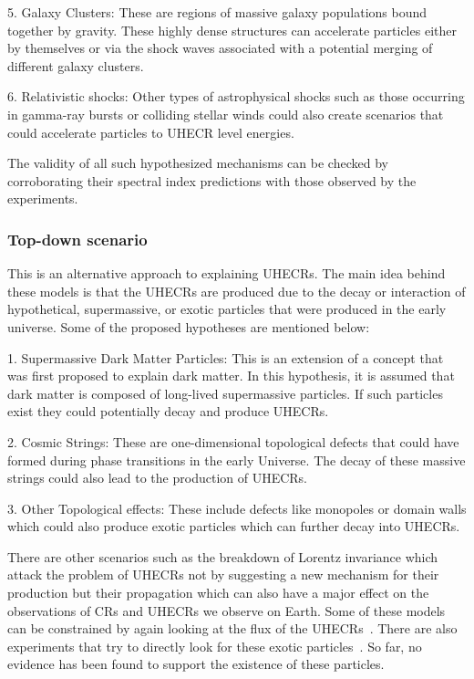 5. Galaxy Clusters: These are regions of massive galaxy populations bound together by gravity. These highly dense structures can accelerate particles either by themselves or via the shock waves associated with a potential merging of different galaxy clusters.~\cite{Murase_2008,Condorelli_2023} 

6. Relativistic shocks: Other types of astrophysical shocks such as those occurring in gamma-ray bursts or colliding stellar winds could also create scenarios that could accelerate particles to UHECR level energies.~\cite{Kirk_2000,10.1046/j.1365-8711.2001.04851.x}

The validity of all such hypothesized mechanisms can be checked by corroborating their spectral index predictions with those observed by the experiments. 

\subsubsection{Top-down scenario}
\label{subsec:Tdownsce}
This is an alternative approach to explaining UHECRs. The main idea behind these models is that the UHECRs are produced due to the decay or interaction of hypothetical, supermassive, or exotic particles that were produced in the early universe. Some of the proposed hypotheses are mentioned below:

1. Supermassive Dark Matter Particles: This is an extension of a concept that was first proposed to explain dark matter. In this hypothesis, it is assumed that dark matter is composed of long-lived supermassive particles. If such particles exist they could potentially decay and produce UHECRs.~\cite{ALOISIO2008307,MARZOLA201756}

2. Cosmic Strings: These are one-dimensional topological defects that could have formed during phase transitions in the early Universe. The decay of these massive strings could also lead to the production of UHECRs.~\cite{BHATTACHARJEE2000109,PhysRevD.64.043004}

3. Other Topological effects: These include defects like monopoles or domain walls which could also produce exotic particles which can further decay into UHECRs.~\cite{PhysRevLett.79.5202} 

There are other scenarios such as the breakdown of Lorentz invariance which attack the problem of UHECRs not by suggesting a new mechanism for their production but their propagation which can also have a major effect on the observations of CRs and UHECRs we observe on Earth. Some of these models can be constrained by again looking at the flux of the UHECRs~\cite{PierreAuger:2021tog}. There are also experiments that try to directly look for these exotic particles~\cite{XENON:2023cxc,LZ:2022lsv}. So far, no evidence has been found to support the existence of these particles. 

